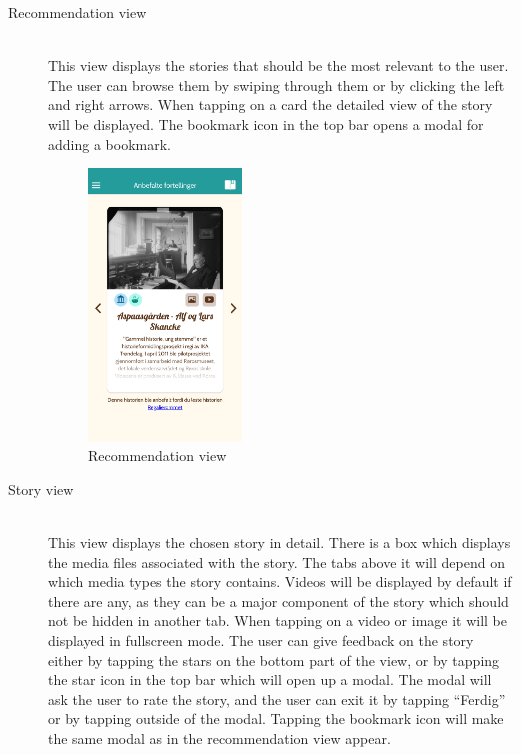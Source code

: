 \begin{description}
	
	\item[Recommendation view] \hfill \\ 
	This view displays the stories that should be the most relevant to the user. The user can browse them by swiping through them or by clicking the left and right arrows. When tapping on a card the detailed view of the story will be displayed. The bookmark icon in the top bar opens a modal for adding a bookmark. 
	
	\begin{figure}[h!]
		\centering
		\includegraphics[width=0.4\textwidth]{fig/screenshot_recommendations}
		\caption{Recommendation view}
		\label{Fig:recommendation_view}
	\end{figure}
	
	\item[Story view] \hfill \\
	This view displays the chosen story in detail. There is a box which displays the media files associated with the story. The tabs above it will depend on which media types the story contains. Videos will be displayed by default if there are any, as they can be a major component of the story which should not be hidden in another tab. When tapping on a video or image it will be displayed in fullscreen mode. The user can give feedback on the story either by tapping the stars on the bottom part of the view, or by tapping the star icon in the top bar which will open up a modal. The modal will ask the user to rate the story, and the user can exit it by tapping “Ferdig” or by tapping outside of the modal. Tapping the bookmark icon will make the same modal as in the recommendation view appear. 

\end{description}

